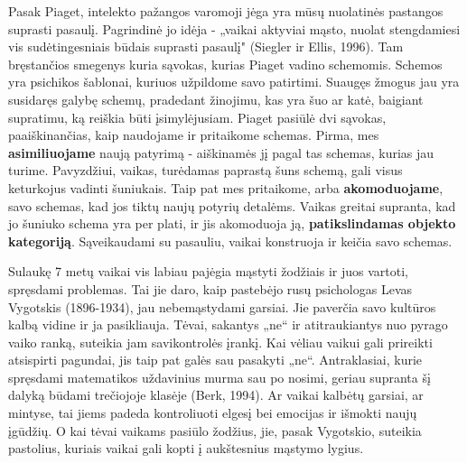 \documentclass{article}
\begin{document}
Pasak Piaget, intelekto pažangos varomoji jėga yra mūsų nuolatinės pastangos
suprasti pasaulį. Pagrindinė jo idėja - „vaikai aktyviai mąsto, nuolat stengdamiesi
vis sudėtingesniais būdais suprasti pasaulį" (Siegler ir Ellis, 1996). Tam
bręstančios smegenys kuria sąvokas, kurias Piaget vadino schemomis. Schemos
yra psichikos šablonai, kuriuos užpildome savo patirtimi. Suaugęs žmogus
jau yra susidaręs galybę schemų, pradedant žinojimu, kas yra šuo ar katė,
baigiant supratimu, ką reiškia būti įsimylėjusiam. Piaget pasiūlė dvi sąvokas, paaiškinančias, kaip naudojame ir pritaikome schemas. Pirma, mes \textbf{asimiliuojame} naują patyrimą - aiškinamės jį pagal tas schemas,
kurias jau turime. Pavyzdžiui, vaikas, turėdamas paprastą šuns schemą, gali visus keturkojus vadinti šuniukais. Taip pat mes pritaikome, arba \textbf{akomoduojame}, savo schemas, kad jos tiktų naujų potyrių detalėms. Vaikas greitai supranta, kad jo šuniuko schema yra per plati, ir jis akomoduoja ją, \textbf{patikslindamas objekto kategoriją}. Sąveikaudami su pasauliu, vaikai konstruoja ir keičia savo schemas.

Sulaukę 7 metų vaikai vis labiau pajėgia mąstyti žodžiais ir juos vartoti,
spręsdami problemas. Tai jie daro, kaip pastebėjo rusų psichologas Levas Vygotskis
(1896-1934), jau nebemąstydami garsiai. Jie paverčia savo kultūros kalbą
vidine ir ja pasikliauja. Tėvai, sakantys „ne“ ir atitraukiantys nuo pyrago vaiko
ranką, suteikia jam savikontrolės įrankį. Kai vėliau vaikui gali prireikti atsispirti
pagundai, jis taip pat galės sau pasakyti „ne“. Antraklasiai, kurie spręsdami matematikos
uždavinius murma sau po nosimi, geriau supranta šį dalyką būdami
trečiojoje klasėje (Berk, 1994). Ar vaikai kalbėtų garsiai, ar mintyse, tai jiems
padeda kontroliuoti elgesį bei emocijas ir išmokti naujų įgūdžių. O kai tėvai vaikams
pasiūlo žodžius, jie, pasak Vygotskio, suteikia pastolius, kuriais vaikai gali
kopti į aukštesnius mąstymo lygius.
\end{document}
